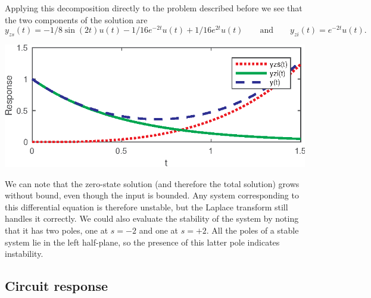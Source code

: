 \documentclass[10pt]{beamer}
\begin{document}
Applying this decomposition directly to the problem described before we see that the two components of the solution are
\begin{equation*}
  y_{zs}(t) = -1/8 \sin(2 t) u(t) - 1/16 e^{-2 t} u(t) + 1/16 e^{2 t} u(t) \qquad \text{and} \qquad y_{zi}(t) = e^{-2t} u(t).
\end{equation*}
\begin{center}
  \includegraphics{lapdezizs}
\end{center}
We can note that the zero-state solution (and therefore the total solution) grows without bound, even though the input is bounded.  Any system corresponding to this differential equation is therefore unstable, but the Laplace transform still handles it correctly.  We could also evaluate the stability of the system by noting that it has two poles, one at $s=-2$ and one at $s=+2$.  All the poles of a stable system lie in the left half-plane, so the presence of this latter pole indicates instability.

\subsection{Circuit response}
\end{document}
